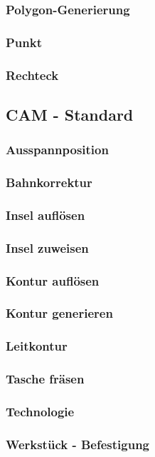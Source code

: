 \documentclass[a5paper]{book}
\begin{document}
			\subsubsection{Polygon-Generierung} 
			\subsubsection{Punkt} 
			\subsubsection{Rechteck} 
		\subsection{CAM - Standard}
			\subsubsection{Ausspannposition} 
			\subsubsection{Bahnkorrektur} 
			\subsubsection{Insel auflösen}
			\subsubsection{Insel zuweisen} 
			\subsubsection{Kontur auflösen}
			\subsubsection{Kontur generieren}
			\subsubsection{Leitkontur} 
			\subsubsection{Tasche fräsen} 
			\subsubsection{Technologie} 
			\subsubsection{Werkstück - Befestigung} 
\end{document}
